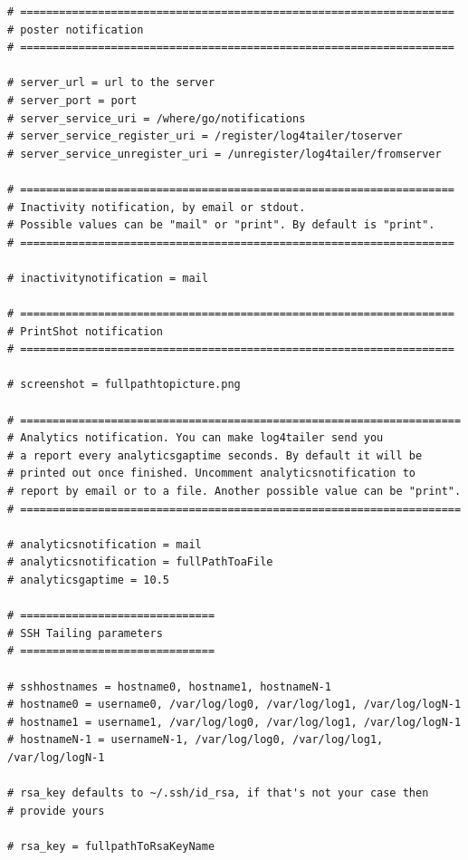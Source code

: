 \begin{verbatim}
# ===================================================================
# poster notification
# ===================================================================

# server_url = url to the server
# server_port = port
# server_service_uri = /where/go/notifications
# server_service_register_uri = /register/log4tailer/toserver
# server_service_unregister_uri = /unregister/log4tailer/fromserver

# ===================================================================
# Inactivity notification, by email or stdout.
# Possible values can be "mail" or "print". By default is "print".
# ===================================================================

# inactivitynotification = mail

# ===================================================================
# PrintShot notification
# ===================================================================

# screenshot = fullpathtopicture.png

# ====================================================================
# Analytics notification. You can make log4tailer send you 
# a report every analyticsgaptime seconds. By default it will be 
# printed out once finished. Uncomment analyticsnotification to 
# report by email or to a file. Another possible value can be "print".
# ====================================================================

# analyticsnotification = mail
# analyticsnotification = fullPathToaFile
# analyticsgaptime = 10.5

# ==============================
# SSH Tailing parameters
# ==============================

# sshhostnames = hostname0, hostname1, hostnameN-1
# hostname0 = username0, /var/log/log0, /var/log/log1, /var/log/logN-1
# hostname1 = username1, /var/log/log0, /var/log/log1, /var/log/logN-1
# hostnameN-1 = usernameN-1, /var/log/log0, /var/log/log1, /var/log/logN-1

# rsa_key defaults to ~/.ssh/id_rsa, if that's not your case then 
# provide yours

# rsa_key = fullpathToRsaKeyName 


\end{verbatim}

\newpage
